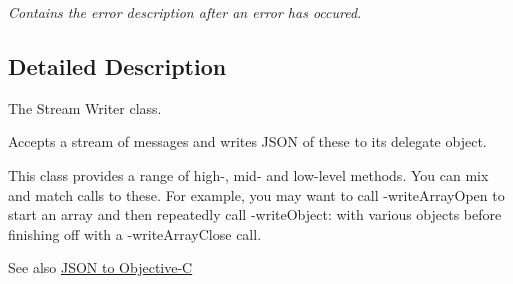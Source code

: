 \begin{DoxyCompactItemize}
\begin{DoxyCompactList}\small\item\em \-Contains the error description after an error has occured. \end{DoxyCompactList}\end{DoxyCompactItemize}


\subsection{\-Detailed \-Description}
\-The \-Stream \-Writer class. 

\-Accepts a stream of messages and writes \-J\-S\-O\-N of these to its delegate object.

\-This class provides a range of high-\/, mid-\/ and low-\/level methods. \-You can mix and match calls to these. \-For example, you may want to call -\/write\-Array\-Open to start an array and then repeatedly call -\/write\-Object\-: with various objects before finishing off with a -\/write\-Array\-Close call.

\begin{DoxySeeAlso}{\-See also}
\hyperlink{json2objc}{\-J\-S\-O\-N to \-Objective-\/\-C} 
\end{DoxySeeAlso}



